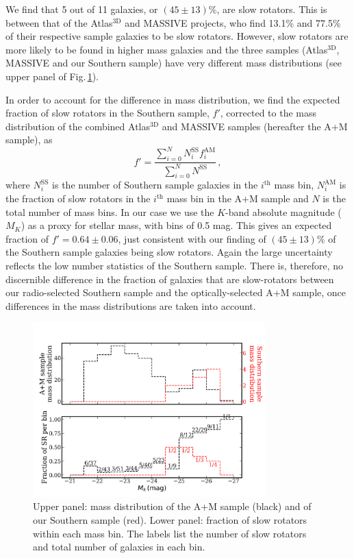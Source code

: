 		We find that 5 out of 11 galaxies, or $(45\pm13)$\%, are slow rotators. This is between that of the Atlas$^\text{3D}$ and MASSIVE projects, who find 13.1\% and 77.5\% of their respective sample galaxies to be slow rotators. However, slow rotators are more likely to be found in higher mass galaxies and the three samples (Atlas$^\text{3D}$, MASSIVE and our Southern sample) have very different mass distributions (see upper panel of Fig.\,\ref{fig:SRmassFraction}).

		In order to account for the difference in mass distribution, we find the expected fraction of slow rotators in the Southern sample, $f'$, corrected to the mass distribution of the combined Atlas$^\text{3D}$ and MASSIVE samples (hereafter the A+M sample), as
		\begin{equation}
			f' = \frac{\sum_{i=0}^N N^\mathrm{SS}_i f^\mathrm{AM}_i}{\sum_{i=0}^N N^\mathrm{SS}} \, , 
		\end{equation}
		where $N^\mathrm{SS}_i$ is the number of Southern sample galaxies in the $i^\mathrm{th}$ mass bin, $N^\mathrm{AM}_i$ is the fraction of slow rotators in the $i^\mathrm{th}$ mass bin in the A+M sample and $N$ is the total number of mass bins. In our case we use the $K$-band absolute magnitude ($M_K$) as a proxy for stellar mass, with bins of 0.5 mag. This gives an expected fraction of $f' = 0.64 \pm 0.06$, just consistent with our finding of $(45\pm13)$\% of the Southern sample galaxies being slow rotators. Again the large uncertainty reflects the low number statistics of the Southern sample. There is, therefore, no discernible difference in the fraction of galaxies that are slow-rotators between our radio-selected Southern sample and the optically-selected A+M sample, once differences in the mass distributions are taken into account. 

		\begin{figure}[t]
			\centering
			\includegraphics[width=0.8\textwidth]{chapter4/M_k_binned.png}
			\caption[Mass matching global kinematics]{Upper panel: mass distribution of the A+M sample (black) and of our Southern sample (red). Lower panel: fraction of slow rotators within each mass bin. The labels list the number of slow rotators and total number of galaxies in each bin.}
			\label{fig:SRmassFraction}
		\end{figure}

